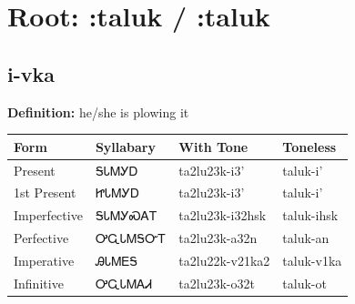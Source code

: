 \documentclass{article}%
\begin{document}
%
\normalsize%
\section*{Root: :taluk / :taluk}%
\subsection*{i-vka}%
\textbf{Definition: }%
he/she is plowing it%
\\[0.5em]%
\begin{tabular}{|l|l|l|l|}%
\hline%
\textbf{Form}&\textbf{Syllabary}&\textbf{With Tone}&\textbf{Toneless}\\%
\hline%
Present&ᎦᏓᎷᎩᎠ&ta2lu23k{-}i3'&taluk{-}i'\\%
1st Present&ᏥᏓᎷᎩᎠ&ta2lu23k{-}i3'&taluk{-}i'\\%
Imperfective&ᎦᏓᎷᎩᏍᎪᎢ&ta2lu23k{-}i32hsk&taluk{-}ihsk\\%
Perfective&ᎤᏩᏓᎷᎦᏅᎢ&ta2lu23k{-}a32n&taluk{-}an\\%
Imperative&ᎯᏓᎷᎬᎦ&ta2lu22k{-}v21ka2&taluk{-}v1ka\\%
Infinitive&ᎤᏩᏓᎷᎪᏗ&ta2lu23k{-}o32t&taluk{-}ot\\%
\hline%
\end{tabular}%
\\[1em]%
\end{document}
